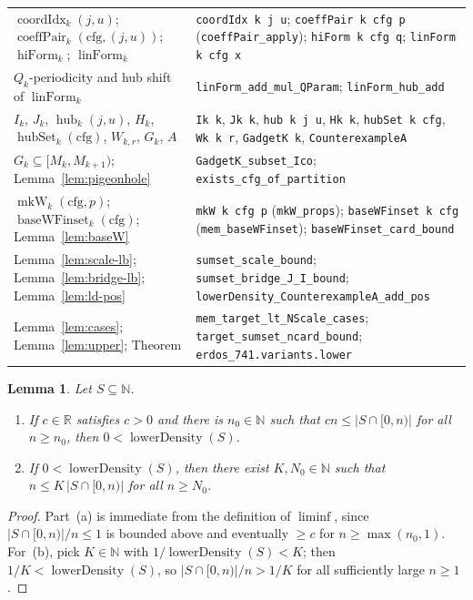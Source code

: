 \documentclass[11pt,a4paper]{amsart}
\newtheorem{lemma}{Lemma}
\newcommand{\linForm}{\operatorname{linForm}}
\newcommand{\hiForm}{\operatorname{hiForm}}
\newcommand{\coeffPair}{\operatorname{coeffPair}}
\newcommand{\coordIdx}{\operatorname{coordIdx}}
\newcommand{\hub}{\operatorname{hub}}
\newcommand{\hubSet}{\operatorname{hubSet}}
\newcommand{\mkW}{\operatorname{mkW}}
\newcommand{\baseW}{\operatorname{baseWFinset}}
\newcommand{\lowerDensity}{\operatorname{lowerDensity}}
\begin{document}
\begin{longtable}{@{}>{\raggedright\arraybackslash}p{}>{\raggedright\arraybackslash}p{}@{}}
$\coordIdx_k(j, u)$; $\coeffPair_k(\mathrm{cfg}, (j, u))$; $\hiForm_k$; $\linForm_k$ & \texttt{coordIdx k j u}; \texttt{coeffPair k cfg p} (\texttt{coeffPair\_apply}); \texttt{hiForm k cfg q}; \texttt{linForm k cfg x} \\
$Q_k$-periodicity and hub shift of $\linForm_k$ & \texttt{linForm\_add\_mul\_QParam}; \texttt{linForm\_hub\_add} \\
$I_k$, $J_k$, $\hub_k(j, u)$, $H_k$, $\hubSet_k(\mathrm{cfg})$, $W_{k,r}$, $G_k$, $A$ & \texttt{Ik k}, \texttt{Jk k}, \texttt{hub k j u}, \texttt{Hk k}, \texttt{hubSet k cfg}, \texttt{Wk k r}, \texttt{GadgetK k}, \texttt{CounterexampleA} \\
$G_k \subseteq [M_k, M_{k+1})$; Lemma~\ref{lem:pigeonhole} & \texttt{GadgetK\_subset\_Ico}; \texttt{exists\_cfg\_of\_partition} \\
$\mkW_k(\mathrm{cfg}, p)$; $\baseW_k(\mathrm{cfg})$; Lemma~\ref{lem:baseW} & \texttt{mkW k cfg p} (\texttt{mkW\_props}); \texttt{baseWFinset k cfg} (\texttt{mem\_baseWFinset}); \texttt{baseWFinset\_card\_bound} \\
Lemma~\ref{lem:scale-lb}; Lemma~\ref{lem:bridge-lb}; Lemma~\ref{lem:ld-pos} & \texttt{sumset\_scale\_bound}; \texttt{sumset\_bridge\_J\_I\_bound}; \texttt{lowerDensity\_CounterexampleA\_add\_pos} \\
Lemma~\ref{lem:cases}; Lemma~\ref{lem:upper}; Theorem & \texttt{mem\_target\_lt\_NScale\_cases}; \texttt{target\_sumset\_ncard\_bound}; \texttt{erdos\_741.variants.lower} \\
\hline
\end{longtable}
\endgroup

\begin{lemma}\label{lem:ld}
Let $S \subseteq \mathbb{N}$.
\begin{enumerate}
\item[(a)] If $c \in \mathbb{R}$ satisfies $c > 0$ and there is $n_0 \in \mathbb{N}$ such that $c n \le |S \cap [0, n)|$ for all $n \ge n_0$, then $0 < \lowerDensity(S)$.
\item[(b)] If $0 < \lowerDensity(S)$, then there exist $K, N_0 \in \mathbb{N}$ such that $n \le K \, |S \cap [0, n)|$ for all $n \ge N_0$.
\end{enumerate}
\end{lemma}

\begin{proof}
Part~(a) is immediate from the definition of $\liminf$, since $|S \cap [0, n)| / n \le 1$ is bounded above and eventually $\ge c$ for $n \ge \max(n_0, 1)$. For~(b), pick $K \in \mathbb{N}$ with $1 / \lowerDensity(S) < K$; then $1 / K < \lowerDensity(S)$, so $|S \cap [0, n)| / n > 1 / K$ for all sufficiently large $n \ge 1$.
\end{proof}
\end{document}
